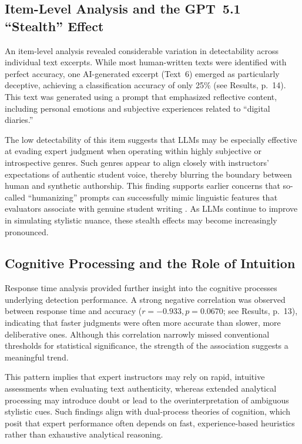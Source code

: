 \documentclass[12pt]{article}
\begin{document}
\subsection{Item-Level Analysis and the GPT~5.1 ``Stealth'' Effect}

An item-level analysis revealed considerable variation in detectability across individual text excerpts. While most human-written texts were identified with perfect accuracy, one AI-generated excerpt (Text~6) emerged as particularly deceptive, achieving a classification accuracy of only 25\% (see Results, p.~14). This text was generated using a prompt that emphasized reflective content, including personal emotions and subjective experiences related to ``digital diaries.''

The low detectability of this item suggests that LLMs may be especially effective at evading expert judgment when operating within highly subjective or introspective genres. Such genres appear to align closely with instructors’ expectations of authentic student voice, thereby blurring the boundary between human and synthetic authorship. This finding supports earlier concerns that so-called ``humanizing'' prompts can successfully mimic linguistic features that evaluators associate with genuine student writing \autocite[10]{chaka_detecting_2023}. As LLMs continue to improve in simulating stylistic nuance, these stealth effects may become increasingly pronounced.

\subsection{Cognitive Processing and the Role of Intuition}

Response time analysis provided further insight into the cognitive processes underlying detection performance. A strong negative correlation was observed between response time and accuracy ($r = -0.933, p = 0.0670$; see Results, p.~13), indicating that faster judgments were often more accurate than slower, more deliberative ones. Although this correlation narrowly missed conventional thresholds for statistical significance, the strength of the association suggests a meaningful trend.

This pattern implies that expert instructors may rely on rapid, intuitive assessments when evaluating text authenticity, whereas extended analytical processing may introduce doubt or lead to the overinterpretation of ambiguous stylistic cues. Such findings align with dual-process theories of cognition, which posit that expert performance often depends on fast, experience-based heuristics rather than exhaustive analytical reasoning.
\end{document}
